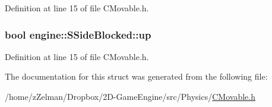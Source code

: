 Definition at line 15 of file C\-Movable.\-h.

\hypertarget{structengine_1_1SSideBlocked_a62f8b294229bf0f52bc01ffcc9086202}{
\subsubsection[{up}]{\setlength{\rightskip}{0pt plus 5cm}bool engine\-::\-S\-Side\-Blocked\-::up}}\label{structengine_1_1SSideBlocked_a62f8b294229bf0f52bc01ffcc9086202}


Definition at line 15 of file C\-Movable.\-h.



The documentation for this struct was generated from the following file\-:\begin{DoxyCompactItemize}
\item 
/home/z\-Zelman/\-Dropbox/2\-D-\/\-Game\-Engine/src/\-Physics/\hyperlink{CMovable_8h}{C\-Movable.\-h}\end{DoxyCompactItemize}
